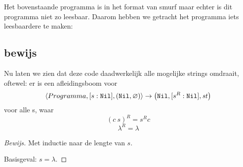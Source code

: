 Het bovenstaande programma is in het format van smurf maar echter is dit programma niet zo leesbaar. 
Daarom hebben we getracht het programma iets leesbaardere te maken: 





\subsection{bewijs} 
Nu laten we zien dat deze code daadwerkelijk alle mogelijke strings omdraait,
oftewel: er is een afleidingsboom voor
$$
\left\langle Programma,[s:\texttt{Nil}],(\texttt{Nil},\varnothing)\right\rangle\to\left(\texttt{Nil},[s^R:\texttt{Nil}],\mathit{st}\right)
$$
voor alle s, waar
$$(c~s)^R=s^R c$$
$$\lambda^R=\lambda$$

\begin{proof}[Bewijs]
	Met inductie naar de lengte van $s$.

	Basisgeval: $s=\lambda$.

	
\end{proof}
